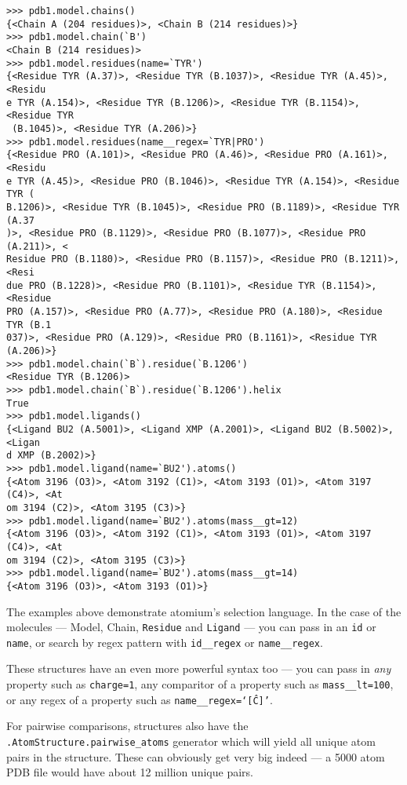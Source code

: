 \begin{footnotesize}
\begin{verbatim}
>>> pdb1.model.chains()
{<Chain A (204 residues)>, <Chain B (214 residues)>}
>>> pdb1.model.chain(`B')
<Chain B (214 residues)>
>>> pdb1.model.residues(name=`TYR')
{<Residue TYR (A.37)>, <Residue TYR (B.1037)>, <Residue TYR (A.45)>, <Residu
e TYR (A.154)>, <Residue TYR (B.1206)>, <Residue TYR (B.1154)>, <Residue TYR
 (B.1045)>, <Residue TYR (A.206)>}
>>> pdb1.model.residues(name__regex=`TYR|PRO')
{<Residue PRO (A.101)>, <Residue PRO (A.46)>, <Residue PRO (A.161)>, <Residu
e TYR (A.45)>, <Residue PRO (B.1046)>, <Residue TYR (A.154)>, <Residue TYR (
B.1206)>, <Residue TYR (B.1045)>, <Residue PRO (B.1189)>, <Residue TYR (A.37
)>, <Residue PRO (B.1129)>, <Residue PRO (B.1077)>, <Residue PRO (A.211)>, <
Residue PRO (B.1180)>, <Residue PRO (B.1157)>, <Residue PRO (B.1211)>, <Resi
due PRO (B.1228)>, <Residue PRO (B.1101)>, <Residue TYR (B.1154)>, <Residue
PRO (A.157)>, <Residue PRO (A.77)>, <Residue PRO (A.180)>, <Residue TYR (B.1
037)>, <Residue PRO (A.129)>, <Residue PRO (B.1161)>, <Residue TYR (A.206)>}
>>> pdb1.model.chain(`B`).residue(`B.1206')
<Residue TYR (B.1206)>
>>> pdb1.model.chain(`B`).residue(`B.1206').helix
True
>>> pdb1.model.ligands()
{<Ligand BU2 (A.5001)>, <Ligand XMP (A.2001)>, <Ligand BU2 (B.5002)>, <Ligan
d XMP (B.2002)>}
>>> pdb1.model.ligand(name=`BU2').atoms()
{<Atom 3196 (O3)>, <Atom 3192 (C1)>, <Atom 3193 (O1)>, <Atom 3197 (C4)>, <At
om 3194 (C2)>, <Atom 3195 (C3)>}
>>> pdb1.model.ligand(name=`BU2').atoms(mass__gt=12)
{<Atom 3196 (O3)>, <Atom 3192 (C1)>, <Atom 3193 (O1)>, <Atom 3197 (C4)>, <At
om 3194 (C2)>, <Atom 3195 (C3)>}
>>> pdb1.model.ligand(name=`BU2').atoms(mass__gt=14)
{<Atom 3196 (O3)>, <Atom 3193 (O1)>}
\end{verbatim}
\end{footnotesize}


The examples above demonstrate atomium's selection language. In the case of the
molecules --- Model, Chain, \texttt{Residue} and
\texttt{Ligand} --- you can pass in an \texttt{id} or \texttt{name}, or search by regex
pattern with \texttt{id\_\_regex} or \texttt{name\_\_regex}.

These structures have an even more powerful syntax too --- you can pass in \emph{any}
property such as \texttt{charge=1}, any comparitor of a property such as
\texttt{mass\_\_lt=100}, or any regex of a property such as \texttt{name\_\_regex=`[\^C]'}.

For pairwise comparisons, structures also have the
\texttt{.AtomStructure.pairwise\_atoms} generator which will yield all
unique atom pairs in the structure. These can obviously get very big indeed --- a
5000 atom PDB file would have about 12 million unique pairs.

